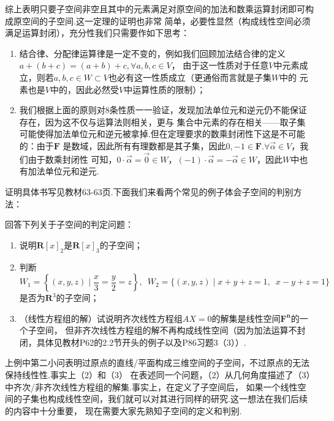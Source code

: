 综上表明只要子空间非空且其中的元素满足对原空间的加法和数乘运算封闭即可构成原空间的子空间.这一定理的证明也非常
简单，必要性显然（构成线性空间必须满足运算封闭），充分性我们只需要作如下思考：
\begin{enumerate}
    \item 结合律、分配律运算律是一定不变的，例如我们回顾加法结合律的定义$a+(b+c)=(a+b)+c,\forall a,b,c\in V$，
    由于这一性质对于任意$V$中元素成立，则若$a,b,c\in W\subset V$也必有这一性质成立（更通俗而言就是子集$W$中的
    元素也是$V$中的，因此必然受$V$中运算性质的限制）；
    \item 我们根据上面的原则对8条性质一一验证，发现加法单位元和逆元仍不能保证存在，因为这不仅与运算法则相关，更与
    集合中元素的存在相关——取子集可能使得加法单位元和逆元被拿掉.但在定理要求的数乘封闭性下这是不可能的：由于$\mathbf{F}$
    是数域，因此所有有理数都是其子集，因此$0,-1\in\mathbf{F}$.$\forall \vec{\alpha}\in V$，我们由于数乘封闭性
    可知，$0\cdot\vec{\alpha}=\vec{0}\in W$，$(-1)\cdot\vec{\alpha}=-\vec{\alpha}\in W$，因此$W$中也有加法单位元和逆元.
\end{enumerate}

证明具体书写见教材63-63页.下面我们来看两个常见的例子体会子空间的判别方法：
\begin{example}\label{ex:2:常见子空间}
    回答下列关于子空间的判定问题：
    \begin{enumerate}[label=(\arabic*)]
        \item 说明$\mathbf{R}[x]_2$是$\mathbf{R}[x]_3$的子空间；

        \item 判断$W_1=\left\{(x,y,z) \mid \dfrac{x}{3}=\dfrac{y}{2}=z\right\},\enspace
            W_2=\{(x,y,z) \mid x+y+z=1,\enspace x-y+z=1\}$是否为$\mathbf{R}^3$的子空间；

        \item （线性方程组的解）试说明齐次线性方程组$AX=0$的解集是线性空间$\mathbf{F^n}$的一个子空间，
        但非齐次线性方程组的解不再构成线性空间（因为加法运算不封闭，具体见教材P62的2.2节开头的例子以及P86习题3（3））.
    \end{enumerate}
\end{example}

上例中第二小问表明过原点的直线/平面构成三维空间的子空间，不过原点的无法保持线性性.事实上（2）和（3）
在表述同一个问题，（2）从几何角度描述了（3）中齐次/非齐次线性方程组的解集.事实上，在定义了子空间后，
如果一个线性空间的子集也构成线性空间，我们就可以对其进行同样的研究.这一想法在我们后续的内容中十分重要，
现在需要大家先熟知子空间的定义和判别.

